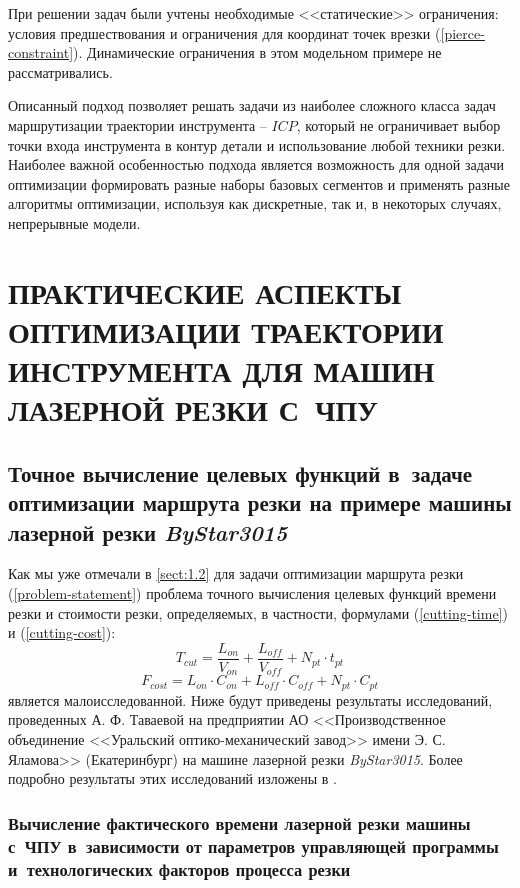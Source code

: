 \documentclass[11pt,twoside,openany]{report}
\newcounter{lem}
\begin{document}
При решении задач были учтены необходимые <<статические>> ограничения:
условия предшествования и ограничения для координат
точек врезки (\ref{pierce-constraint}).
Динамические ограничения в этом модельном примере не рассматривались.

Описанный подход позволяет решать задачи из
наиболее сложного класса задач маршрутизации
траектории инструмента -- $ICP$,
который не ограничивает выбор точки входа
инструмента в контур детали и использование
любой техники резки.
Наиболее важной особенностью подхода
является возможность для одной задачи оптимизации
формировать разные наборы базовых сегментов и
применять разные алгоритмы оптимизации,
используя как дискретные, так и,
в некоторых случаях, непрерывные модели.


\chapter{
  ПРАКТИЧЕСКИЕ АСПЕКТЫ ОПТИМИЗАЦИИ ТРАЕКТОРИИ ИНСТРУМЕНТА
  ДЛЯ МАШИН ЛАЗЕРНОЙ РЕЗКИ С~ЧПУ
}
\setcounter{chapter}{2}
\setcounter{equation}{0}

{\raggedright\section{
  Точное вычисление целевых функций
  в~задаче оптимизации маршрута резки
  на примере машины лазерной резки
  {\it ByStar3015}
}}
\label{sect:2.1}
\setcounter{equation}{0}

Как мы уже  отмечали в \ref{sect:1.2}
для задачи оптимизации маршрута резки (\ref{problem-statement})
проблема точного вычисления целевых функций времени резки и стоимости резки,
определяемых, в частности, формулами (\ref{cutting-time}) и (\ref{cutting-cost}):
$$
T_{cut} = \frac{L_{on}}{V_{on}} + \frac{L_{off}}{V_{off}} +N_{pt} \cdot t_{pt}
$$
$$
F_{cost}=
L_{on} \cdot C_{on} +
L_{off} \cdot C_{off} +
N_{pt} \cdot C_{pt}
$$
является малоисследованной.
Ниже будут приведены результаты исследований,
проведенных А. Ф. Таваевой на предприятии
АО <<Производственное объединение <<Уральский оптико-механический завод>>
имени Э. С. Яламова>>
(Екатеринбург)
на машине лазерной резки
{\it ByStar3015}.
Более подробно результаты этих исследований изложены в
\cite{intro45,intro46,intro47}.

{\raggedright\subsection{
  Вычисление фактического времени лазерной резки
  машины с~ЧПУ
  в~зависимости от параметров управляющей программы
  и~технологических факторов процесса резки
}}
\end{document}
